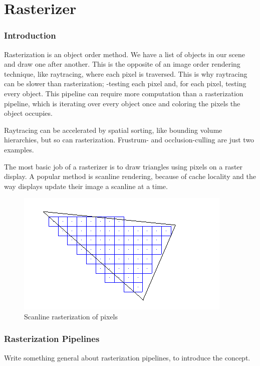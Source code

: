\part{Rasterizer}


\section{Introduction}
Rasterization is an object order method. We have a list of objects in our scene and draw one after another. This is the opposite of an image order rendering technique, like raytracing, where each pixel is traversed. This is why raytracing can be slower than rasterization; -testing each pixel and, for each pixel, testing every object. This pipeline can require more computation than a rasterization pipeline, which is iterating over every object once and coloring the pixels the object occupies.

Raytracing can be accelerated by spatial sorting, like bounding volume hierarchies, but so can rasterization. Frustrum- and occlusion-culling are just two examples.

The most basic job of a rasterizer is to draw triangles using pixels on a raster display. A popular method is scanline rendering, because of cache locality and the way displays update their image a scanline at a time.

\begin{figure}[H]
  \centering
  \includegraphics{Media/raster_scanline.png}
  \caption{Scanline rasterization of pixels}   
  \label{fig:Scanline rasterization of pixels}
\end{figure}


\section{Rasterization Pipelines}

Write something general about rasterization pipelines, to introduce the concept.


